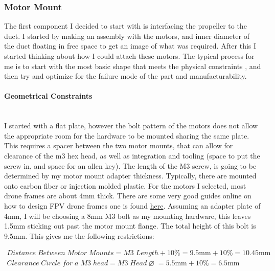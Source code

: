 \documentclass[12pt,letterpaper]{article}
\begin{document}
\subsubsection{Motor Mount}
The first component I decided to start with is interfacing the propeller to the duct. I started by making an assembly with the motors, and inner diameter of the duct floating in free space to get an image of what was required. After this I started thinking about how I could attach these motors. The typical process for me is to start with the most basic shape that meets the physical constraints , and then try and optimize for the failure mode of the part and manufacturability. 
\setcounter{tocdepth}{4}
\setcounter{secnumdepth}{4}
\paragraph{Geometrical Constraints}\mbox{}\\

I started with a flat plate, however the bolt pattern of the motors does not allow the appropriate room for the hardware to be mounted sharing the same plate. This requires a spacer between the two motor mounts, that can allow for clearance of the m3 hex head, as well as integration and tooling (space to put the screw in, and space for an allen key). The length of the M3 screw, is going to be determined by my motor mount adapter thickness. Typically, there are mounted onto carbon fiber or injection molded plastic. For the motors I selected, most drone frames are about 4mm thick. There are some very good guides online on how to design FPV drone frames one is found \href{https://www.youtube.com/watch?v=C_gKnJ7wfto}{here}. Assuming an adapter plate of 4mm, I will be choosing a 8mm M3 bolt as my mounting hardware, this leaves 1.5mm sticking out past the motor mount flange. The total height of this bolt is 9.5mm.  This gives me the following restrictions:

\begin{gather*}
 Distance\;Between\;Motor\;Mounts = M3\;Length + 10\% = 9.5\unit{\mm} + 10\% = 10.45\unit{\mm}  \\
Clearance\;Circle \;for\;a\;M3\;head = M3\;Head\;\diameter\;= 5.5\unit{\mm} + 10\% = 6.5\unit{\mm}
\end{gather*}
\end{document}
